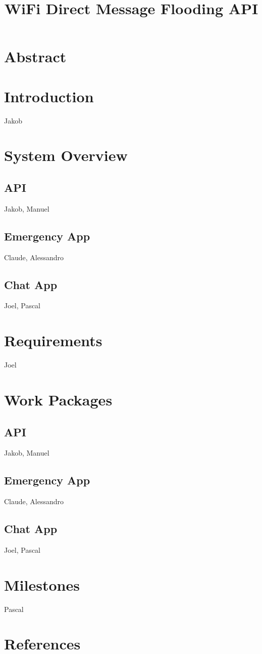 \documentclass[10pt,a4paper]{report}
\title{WiFi Direct Message Flooding API}
\begin{document}
	
	\maketitle
	
	\section{Abstract}
	
	\section{Introduction}
		Jakob
	
	\section{System Overview}
		
		\subsection{API}
		Jakob, Manuel
		
		\subsection{Emergency App}
		Claude, Alessandro
		
		\subsection{Chat App}
		Joel, Pascal
	
	\section{Requirements}
		Joel
	
	\section{Work Packages}
	
		\subsection{API}
			Jakob, Manuel
		
		\subsection{Emergency App}
			Claude, Alessandro
		
		\subsection{Chat App}
			Joel, Pascal
	
	\section{Milestones}
		Pascal
	
	\section{References}
	
	
\end{document}
